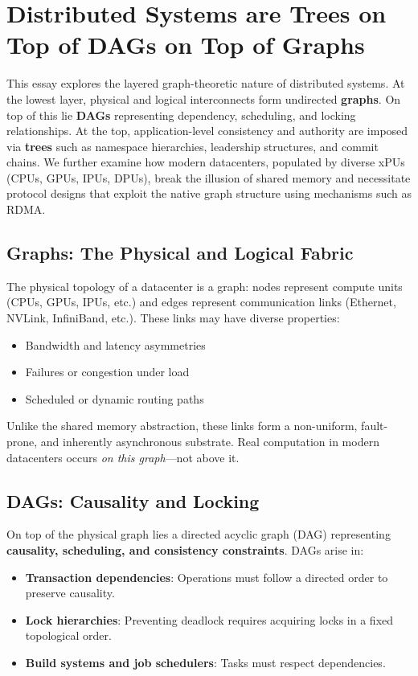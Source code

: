 \section{Distributed Systems are Trees on Top of DAGs on Top of Graphs}

This essay explores the layered graph-theoretic nature of distributed systems. At the lowest layer, physical and logical interconnects form undirected \textbf{graphs}. On top of this lie \textbf{DAGs} representing dependency, scheduling, and locking relationships. At the top, application-level consistency and authority are imposed via \textbf{trees} such as namespace hierarchies, leadership structures, and commit chains. We further examine how modern datacenters, populated by diverse xPUs (CPUs, GPUs, IPUs, DPUs), break the illusion of shared memory and necessitate protocol designs that exploit the native graph structure using mechanisms such as RDMA.

\subsection{Graphs: The Physical and Logical Fabric}
The physical topology of a datacenter is a graph: nodes represent compute units (CPUs, GPUs, IPUs, etc.) and edges represent communication links (Ethernet, NVLink, InfiniBand, etc.). These links may have diverse properties:
\begin{itemize}[noitemsep]
  \item Bandwidth and latency asymmetries
  \item Failures or congestion under load
  \item Scheduled or dynamic routing paths
\end{itemize}

Unlike the shared memory abstraction, these links form a non-uniform, fault-prone, and inherently asynchronous substrate. Real computation in modern datacenters occurs \textit{on this graph}---not above it.

\subsection{DAGs: Causality and Locking}
On top of the physical graph lies a directed acyclic graph (DAG) representing \textbf{causality, scheduling, and consistency constraints}. DAGs arise in:
\begin{itemize}[noitemsep]
  \item \textbf{Transaction dependencies}: Operations must follow a directed order to preserve causality.
  \item \textbf{Lock hierarchies}: Preventing deadlock requires acquiring locks in a fixed topological order.
  \item \textbf{Build systems and job schedulers}: Tasks must respect dependencies.
\end{itemize}

